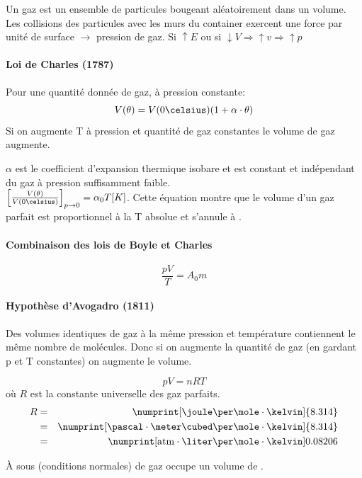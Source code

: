 \documentclass[11pt,a4paper,french]{article}
\newcommand\atm{\mathrm{atm}}
\begin{document}
Un gaz est un ensemble de particules bougeant aléatoirement dans un volume.
Les collisions des particules avec les murs du container exercent une force par unité de surface $\rightarrow$ pression de gaz.
Si $\uparrow E$ ou si $\downarrow V \Rightarrow \uparrow v \Rightarrow \uparrow p$

\paragraph{Loi de Charles (1787)}
Pour une quantité donnée de gaz, à pression constante:
\[ V(\theta)=V(0\celsius)(1+\alpha\cdot \theta) \]
Si on augmente T à pression et quantité de gaz constantes le volume de gaz augmente.

$\alpha$ est le coefficient d'expansion thermique isobare et est constant et indépendant du gaz à pression suffisamment faible.\\

$\left[\frac{V(\theta)}{V(0\celsius)}\right]_{p\rightarrow0}=\alpha_0T[K]$.
Cette équation montre que le volume d'un gaz parfait est proportionnel à la T absolue et s'annule à .

\paragraph{Combinaison des lois de Boyle et Charles}
$$\frac{pV}{T}=A_0m$$

\paragraph{Hypothèse d'Avogadro (1811)}
Des volumes identiques de gaz à la même pression et température contiennent le même nombre de molécules.
Donc si on augmente la quantité de gaz (en gardant p et T constantes) on augmente le volume.

\[ pV = nRT \]
où $R$ est la constante universelle des gaz parfaits.
\begin{eqnarray*}
	R &=& \numprint[\joule\per\mole\cdot\kelvin]{8.314}\\
	&=& \numprint[\pascal\cdot\meter\cubed\per\mole\cdot\kelvin]{8.314}\\
	&=& \numprint[\atm\cdot\liter\per\mole\cdot\kelvin]{0.08206}
\end{eqnarray*}

\`A  sous  (conditions normales)  de gaz occupe un volume de .
\end{document}
